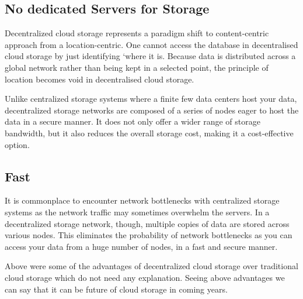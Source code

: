 \subsection{No dedicated Servers for Storage}

Decentralized cloud storage represents a paradigm shift to content-centric approach from a location-centric. One cannot access the database in decentralised cloud storage by just identifying ‘where it is. Because data is distributed across a global network rather than being kept in a selected point, the principle of location becomes void in decentralised cloud storage.

Unlike centralized storage systems where a finite few data centers host your data, decentralized storage networks are composed of a series of nodes eager to host the data in a secure manner. It does not only offer a wider range of storage bandwidth, but it also reduces the overall storage cost, making it a cost-effective option.

\subsection{Fast}

It is commonplace to encounter network bottlenecks with centralized storage systems as the network traffic may sometimes overwhelm the servers. In a decentralized storage network, though, multiple copies of data are stored across various nodes. This eliminates the probability of network bottlenecks as you can access your data from a huge number of nodes, in a fast and secure manner.

Above were some of the advantages of decentralized cloud storage over traditional cloud storage which do not need any explanation. Seeing above advantages we can say that it can be future of cloud storage in coming years.